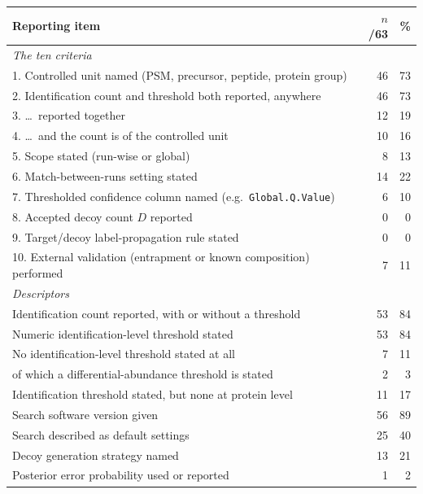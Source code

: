 \begin{tabular}{p{10.4cm}rr}
\toprule
\textbf{Reporting item} & \textbf{$n$/63} & \textbf{\%} \\
\midrule
\multicolumn{3}{l}{\textit{The ten criteria}}\\
1. Controlled unit named (PSM, precursor, peptide, protein group) & 46 & 73 \\
2. Identification count and threshold both reported, anywhere & 46 & 73 \\
3. \quad \dots\ reported together & 12 & 19 \\
4. \quad \dots\ and the count is of the controlled unit & 10 & 16 \\
5. Scope stated (run-wise or global) & 8 & 13 \\
6. Match-between-runs setting stated & 14 & 22 \\
7. Thresholded confidence column named (e.g.\ \texttt{Global.Q.Value}) & 6 & 10 \\
8. Accepted decoy count $D$ reported & 0 & 0 \\
9. Target/decoy label-propagation rule stated & 0 & 0 \\
10. External validation (entrapment or known composition) performed & 7 & 11 \\
\midrule
\multicolumn{3}{l}{\textit{Descriptors}}\\
Identification count reported, with or without a threshold & 53 & 84 \\
Numeric identification-level threshold stated & 53 & 84 \\
No identification-level threshold stated at all & 7 & 11 \\
\quad of which a differential-abundance threshold is stated & 2 & 3 \\
Identification threshold stated, but none at protein level & 11 & 17 \\
Search software version given & 56 & 89 \\
Search described as default settings & 25 & 40 \\
Decoy generation strategy named & 13 & 21 \\
Posterior error probability used or reported & 1 & 2 \\
\bottomrule
\end{tabular}
